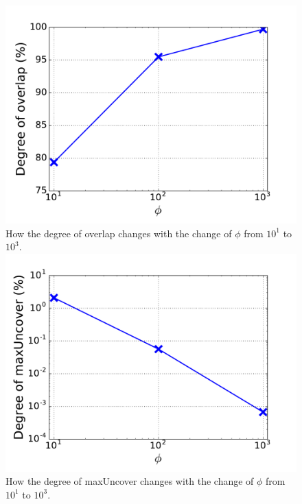 \begin{figure}[!htb]
  \includegraphics[width=\linewidth]{figure/overlap.pdf}
  {How the degree of overlap changes with the change of $\phi$ from $10^1$ to $10^3$.}
\endminipage\hfill
{}
  \includegraphics[width=\linewidth]{figure/maxUncover.pdf}
  {How the degree of maxUncover changes with the change of $\phi$ from $10^1$ to $10^3$.}
\endminipage\hfill
{}%

\end{figure}
